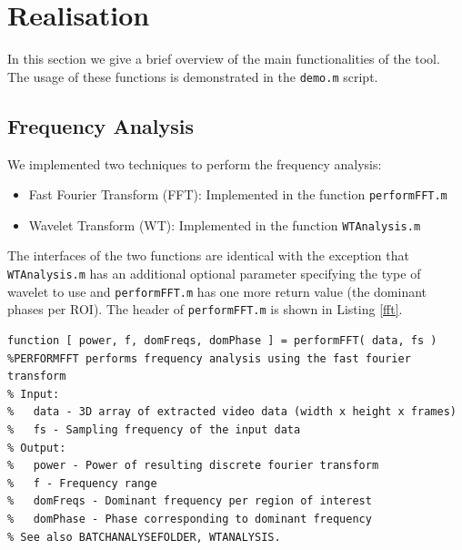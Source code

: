 \documentclass[11pt]{scrartcl}
\begin{document}

\section{Realisation} 

In this section we give a brief overview of the main functionalities of the tool. The usage of these functions is demonstrated in the \texttt{demo.m} script.

\subsection{Frequency Analysis}

We implemented two techniques to perform the frequency analysis: 

\begin{itemize}
\item Fast Fourier Transform (FFT): Implemented in the function  \texttt{performFFT.m} 
\item Wavelet Transform (WT): Implemented in the function  \texttt{WTAnalysis.m} 
\end{itemize}

The interfaces of the two functions are identical with the exception that \texttt{WTAnalysis.m} has an additional optional parameter specifying the type of wavelet to use and \texttt{performFFT.m} has one more return value (the dominant phases per ROI). The header of \texttt{performFFT.m} is shown in Listing \ref{fft}.

\begin{minipage}{\linewidth}
  \begin{lstlisting}[caption={Function performing the frequency analysis using the FFT.}, label=fft]
function [ power, f, domFreqs, domPhase ] = performFFT( data, fs )
%PERFORMFFT performs frequency analysis using the fast fourier transform
% Input:
%   data - 3D array of extracted video data (width x height x frames)
%   fs - Sampling frequency of the input data
% Output:
%   power - Power of resulting discrete fourier transform
%   f - Frequency range
%   domFreqs - Dominant frequency per region of interest 
%   domPhase - Phase corresponding to dominant frequency
% See also BATCHANALYSEFOLDER, WTANALYSIS.
  \end{lstlisting}
\end{minipage}
\end{document}
